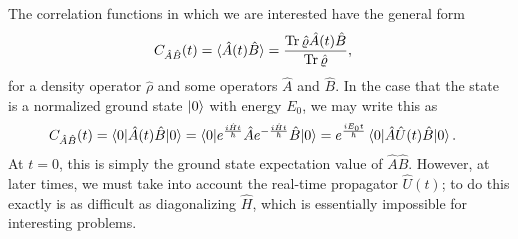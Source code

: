 The correlation functions in which we are interested have the general form
\begin{align}
	C_{\hat{A} \hat{B}}(t)
	&= \langle \hat{A}(t) \hat{B} \rangle
	= \frac{\operatorname{Tr}{\hat{\varrho} \hat{A}(t) \hat{B}}}{\operatorname{Tr}{\hat{\varrho}}},
\end{align}
for a density operator $\hat{\rho}$ and some operators $\hat{A}$ and $\hat{B}$.
In the case that the state is a normalized ground state $\ket{0}$ with energy $E_0$, we may write this as
\begin{align}
	C_{\hat{A} \hat{B}}(t)
	&= \braket{0 | \hat{A}(t) \hat{B} | 0}
	= \braket{0 | e^{\frac{i \hat{H} t}{\hbar}} \hat{A} e^{-\frac{i \hat{H} t}{\hbar}} \hat{B} | 0}
	= e^{\frac{i E_0 t}{\hbar}} \braket{0 | \hat{A} \hat{U}(t) \hat{B} | 0}.
\end{align}
At $t = 0$, this is simply the ground state expectation value of $\hat{A} \hat{B}$.
However, at later times, we must take into account the real-time propagator $\hat{U}(t)$; to do this exactly is as difficult as diagonalizing $\hat{H}$, which is essentially impossible for interesting problems.


